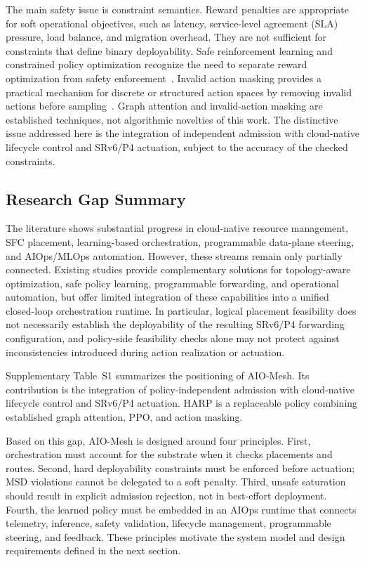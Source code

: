 \documentclass[final,5p]{elsarticle}
\newcommand{\rev}[1]{\textcolor{revisiongreen}{#1}}
\let\newrev\rev
\begin{document}
The main safety issue is constraint semantics. Reward penalties are appropriate for soft operational objectives, such as latency, \rev{service-level agreement (SLA)} pressure, load balance, and migration overhead. They are not sufficient for constraints that define binary deployability. Safe reinforcement learning and constrained policy optimization recognize the need to separate reward optimization from safety enforcement~\cite{gu2024safe,ma2022conservative,wachi2024constraint}. Invalid action masking provides a practical mechanism for discrete or structured action spaces by removing invalid actions before sampling~\cite{huang2022closer}. \newrev{Graph attention and invalid-action masking are established techniques, not algorithmic novelties of this work.} The distinctive issue addressed here is the integration of independent admission with cloud-native lifecycle control and SRv6/P4 actuation, subject to the accuracy of the checked constraints.

\subsection{Research Gap Summary}
\label{subsec:related_gap}
\sloppy
The literature shows substantial progress in cloud-native resource management, SFC placement, learning-based orchestration, programmable data-plane steering, and AIOps/MLOps automation. However, these streams remain only partially connected. \rev{Existing studies provide complementary solutions for topology-aware optimization, safe policy learning, programmable forwarding, and operational automation, but offer limited integration of these capabilities into a unified closed-loop orchestration runtime. In particular, logical placement feasibility does not necessarily establish the deployability of the resulting SRv6/P4 forwarding configuration, and policy-side feasibility checks alone may not protect against inconsistencies introduced during action realization or actuation.}

Supplementary Table~S1 summarizes the positioning of AIO-Mesh. \rev{Its contribution is the integration of policy-independent admission with cloud-native lifecycle control and SRv6/P4 actuation. HARP is a replaceable policy combining established graph attention, PPO, and action masking.}

Based on this gap, AIO-Mesh is designed around four principles. \newrev{First, orchestration must account for the substrate when it checks placements and routes.} Second, hard deployability constraints must be enforced before actuation; MSD violations cannot be delegated to a soft penalty. Third, unsafe saturation should result in explicit admission rejection, not in best-effort deployment. Fourth, the learned policy must be embedded in an AIOps runtime that connects telemetry, inference, safety validation, lifecycle management, programmable steering, and feedback. These principles motivate the system model and design requirements defined in the next section.
\end{document}
